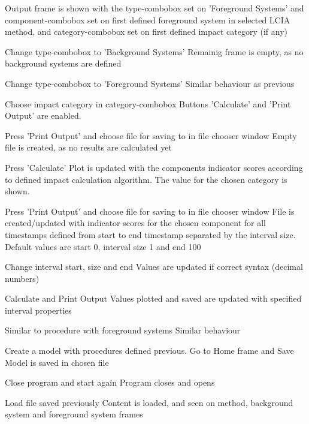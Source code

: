 

{
{Output frame is shown with the type-combobox set on 'Foreground Systems' and component-combobox set on first defined foreground system in selected LCIA method, and category-combobox set on first defined impact category (if any)}

\step
{Change type-combobox to 'Background Systems'}
{Remainig frame is empty, as no background systems are defined}

\step
{Change type-combobox to 'Foreground Systems'}
{Similar behaviour as previous}

\step
{Choose impact category in category-combobox}
{Buttons 'Calculate' and 'Print Output' are enabled.}

\step
{Press 'Print Output' and choose file for saving to in file chooser window}
{Empty file is created, as no results are calculated yet}

\step
{Press 'Calculate'}
{Plot is updated with the components indicator scores according to defined impact calculation algorithm. The value for the chosen category is shown.}

\step
{Press 'Print Output' and choose file for saving to in file chooser window}
{File is created/updated with indicator scores for the chosen component for all timestamps defined from start to end timestamp separated by the interval size. Default values are start 0, interval size 1 and end 100}

\step
{Change interval start, size and end}
{Values are updated if correct syntax (decimal numbers)}

\step
{Calculate and Print Output}
{Values plotted and saved are updated with specified interval properties}
}





{
\step
{Similar to procedure with foreground systems}
{Similar behaviour}
}





{
\step
{Create a model with procedures defined previous. Go to Home frame and Save}
{Model is saved in chosen file}

\step
{Close program and start again}
{Program closes and opens}

\step
{Load file saved previously}
{Content is loaded, and seen on method, background system and foreground system frames}
}
